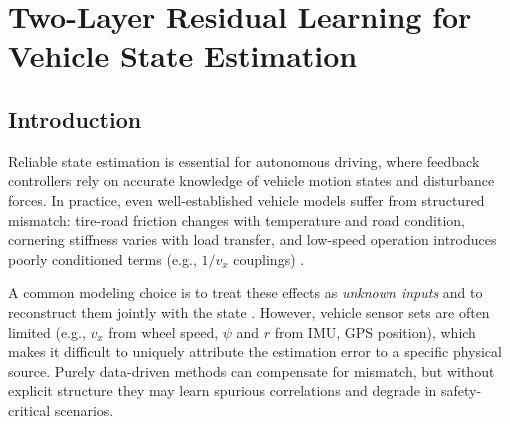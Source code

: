 \chapter[Two-Layer Residual Learning for Vehicle State Estimation]{Two-Layer Residual Learning for Vehicle State Estimation}\label{chp4_chap}


\section{Introduction}\label{ch4_sec_intro}

Reliable state estimation is essential for autonomous driving, where feedback controllers rely on accurate knowledge of vehicle motion states and disturbance forces. In practice, even well-established vehicle models suffer from structured mismatch: tire-road friction changes with temperature and road condition, cornering stiffness varies with load transfer, and low-speed operation introduces poorly conditioned terms (e.g., $1/v_x$ couplings) \cite{RajamaniBOOK}.

A common modeling choice is to treat these effects as \emph{unknown inputs} and to reconstruct them jointly with the state \cite{darouach1994full}. However, vehicle sensor sets are often limited (e.g., $v_x$ from wheel speed, $\psi$ and $r$ from IMU, GPS position), which makes it difficult to uniquely attribute the estimation error to a specific physical source. Purely data-driven methods can compensate for mismatch, but without explicit structure they may learn spurious correlations and degrade in safety-critical scenarios.


